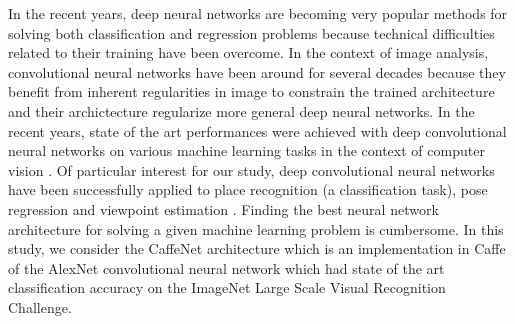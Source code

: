 In the recent years, deep neural networks are becoming very popular methods for solving both classification and regression problems because technical difficulties related to their training have been overcome. In the context of image analysis, convolutional neural networks have been around for several decades because they benefit from inherent regularities in image to constrain the trained architecture and their archictecture regularize more general deep neural networks. In the recent years, state of the art performances were achieved with deep convolutional neural networks on various machine learning tasks in the context of computer vision \cite{NIPS2012_4824,Simonyan14c}. Of particular interest for our study, deep convolutional neural networks have been successfully applied to place recognition \cite{Sunderhauf2015} (a classification task), pose regression \cite{conf/accv/PfisterSCZ14} and viewpoint estimation \cite{Su2015}. Finding the best neural network architecture for solving a given machine learning problem is cumbersome. In this study, we consider the CaffeNet architecture which is an implementation in Caffe of the AlexNet convolutional neural network\cite{NIPS2012_4824} which had state of the art classification accuracy on the ImageNet Large Scale Visual Recognition Challenge.


